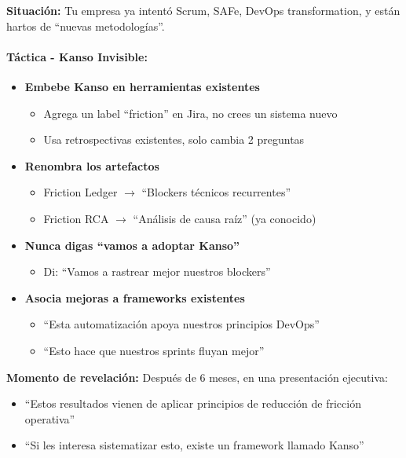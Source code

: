 \textbf{Situación:} Tu empresa ya intentó Scrum, SAFe, DevOps transformation, y están hartos de ``nuevas metodologías''.

\paragraph{Táctica - Kanso Invisible:}

\begin{itemize}
    \item \textbf{Embebe Kanso en herramientas existentes}
    \begin{itemize}
        \item Agrega un label ``friction'' en Jira, no crees un sistema nuevo
        \item Usa retrospectivas existentes, solo cambia 2 preguntas
    \end{itemize}
    \item \textbf{Renombra los artefactos}
    \begin{itemize}
        \item Friction Ledger $\rightarrow$ ``Blockers técnicos recurrentes''
        \item Friction RCA $\rightarrow$ ``Análisis de causa raíz'' (ya conocido)
    \end{itemize}
    \item \textbf{Nunca digas ``vamos a adoptar Kanso''}
    \begin{itemize}
        \item Di: ``Vamos a rastrear mejor nuestros blockers''
    \end{itemize}
    \item \textbf{Asocia mejoras a frameworks existentes}
    \begin{itemize}
        \item ``Esta automatización apoya nuestros principios DevOps''
        \item ``Esto hace que nuestros sprints fluyan mejor''
    \end{itemize}
\end{itemize}

\textbf{Momento de revelación:}
Después de 6 meses, en una presentación ejecutiva:
\begin{itemize}
    \item ``Estos resultados vienen de aplicar principios de reducción de fricción operativa''
    \item ``Si les interesa sistematizar esto, existe un framework llamado Kanso''
\end{itemize}

